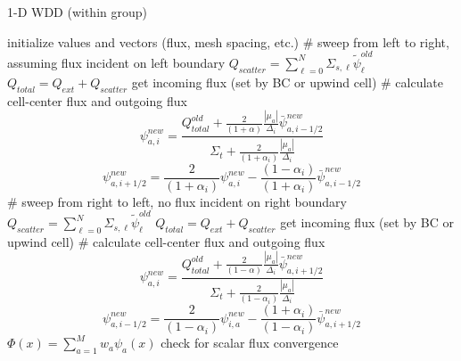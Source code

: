 \documentclass[12pt]{article}
\newcommand{\Di}{\ensuremath{\Delta_i}}
\begin{document}
\begin{algorithm}
\caption{1-D WDD (within group)}
\begin{algorithmic}
\STATE initialize values and vectors (flux, mesh spacing, etc.)
\STATE \# sweep from left to right, assuming flux incident on left boundary
\STATE $Q_{scatter} = \sum_{\ell=0}^{N}\Sigma_{s,\ell}\tilde{\psi}_\ell^{old}$
\STATE $Q_{total} = Q_{ext} + Q_{scatter}$
\STATE get incoming flux (set by BC or upwind cell)
\STATE \# calculate cell-center flux and outgoing flux
\STATE 
\[
\psi_{a,i}^{new} = \frac{Q_{total}^{old} +
\frac{2}{(1+\alpha)}\frac{|\mu_a|}{\Di}\bar{\psi}^{new}_{a,i-1/2}}{\Sigma_{t} + \frac{2}{(1+\alpha_i)}\frac{|\mu_a|}{\Di}}
\]
\[
\psi_{a,i+1/2}^{new} = \frac{2}{(1+\alpha_i)}\psi_{a,i}^{new}-
    \frac{(1-\alpha_i)}{(1+\alpha_i)}\bar{\psi}_{a,i-1/2}^{new}
\]
\ENDFOR
\ENDFOR
\STATE \# sweep from right to left, no flux incident on right boundary
\STATE $Q_{scatter} = \sum_{\ell=0}^{N}\Sigma_{s,\ell}\tilde{\psi}_\ell^{old}$
\STATE $Q_{total} = Q_{ext} + Q_{scatter}$
\STATE get incoming flux (set by BC or upwind cell)
\STATE \# calculate cell-center flux and outgoing flux
\STATE 
\[
\psi_{a,i}^{new} = \frac{Q_{total}^{old} +
\frac{2}{(1-\alpha)}\frac{|\mu_a|}{\Di}\bar{\psi}^{new}_{a,i+1/2}}{\Sigma_{t} + \frac{2}{(1-\alpha_i)}\frac{|\mu_a|}{\Di}}
\]
\[
\psi_{a,i-1/2}^{new} = \frac{2}{(1-\alpha_i)}\psi_{i,a}^{new}-
    \frac{(1+\alpha_i)}{(1-\alpha_i)}\bar{\psi}_{a,i+1/2}^{new}
\]
\ENDFOR
\ENDFOR
\STATE $\Phi(x) = \sum_{a=1}^M w_a\psi_a(x)$
\STATE check for scalar flux convergence
\ENDWHILE
\end{algorithmic}
\end{algorithm}
\end{document}
